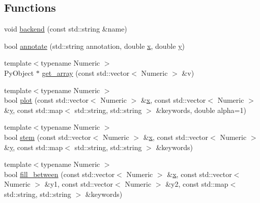 \subsection*{Functions}
\begin{DoxyCompactItemize}
\item 
void \mbox{\hyperlink{namespacematplotlibcpp_a7c176020a3312c69b4af6fa80113e53b}{backend}} (const std\+::string \&name)
\item 
bool \mbox{\hyperlink{namespacematplotlibcpp_a4854fc237468144bd46809ea7ce8f2a0}{annotate}} (std\+::string annotation, double \mbox{\hyperlink{plottingTest_8cpp_aa0155849a1850c1edcfe7bce685b08f1}{x}}, double \mbox{\hyperlink{plottingTest_8cpp_a64d0474b77956c0e971da1b6cb1ddacd}{y}})
\item 
{\footnotesize template$<$typename Numeric $>$ }\\Py\+Object $\ast$ \mbox{\hyperlink{namespacematplotlibcpp_a62d86e190f22181acf7ead76bd57497f}{get\+\_\+array}} (const std\+::vector$<$ Numeric $>$ \&v)
\item 
{\footnotesize template$<$typename Numeric $>$ }\\bool \mbox{\hyperlink{namespacematplotlibcpp_a43b8f4e1cf62c2e9de4ece52fb4bfadf}{plot}} (const std\+::vector$<$ Numeric $>$ \&\mbox{\hyperlink{plottingTest_8cpp_aa0155849a1850c1edcfe7bce685b08f1}{x}}, const std\+::vector$<$ Numeric $>$ \&\mbox{\hyperlink{plottingTest_8cpp_a64d0474b77956c0e971da1b6cb1ddacd}{y}}, const std\+::map$<$ std\+::string, std\+::string $>$ \&keywords, double alpha=1)
\item 
{\footnotesize template$<$typename Numeric $>$ }\\bool \mbox{\hyperlink{namespacematplotlibcpp_ae3c91bdfbe011133346dcc4f31ec5932}{stem}} (const std\+::vector$<$ Numeric $>$ \&\mbox{\hyperlink{plottingTest_8cpp_aa0155849a1850c1edcfe7bce685b08f1}{x}}, const std\+::vector$<$ Numeric $>$ \&\mbox{\hyperlink{plottingTest_8cpp_a64d0474b77956c0e971da1b6cb1ddacd}{y}}, const std\+::map$<$ std\+::string, std\+::string $>$ \&keywords)
\item 
{\footnotesize template$<$typename Numeric $>$ }\\bool \mbox{\hyperlink{namespacematplotlibcpp_a928fb4c83f29554b1b37aeea7af9bb73}{fill\+\_\+between}} (const std\+::vector$<$ Numeric $>$ \&\mbox{\hyperlink{plottingTest_8cpp_aa0155849a1850c1edcfe7bce685b08f1}{x}}, const std\+::vector$<$ Numeric $>$ \&y1, const std\+::vector$<$ Numeric $>$ \&y2, const std\+::map$<$ std\+::string, std\+::string $>$ \&keywords)
\item 

\end{DoxyCompactItemize}
